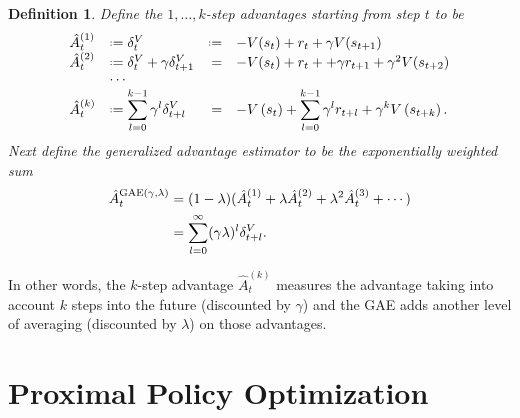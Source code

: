 \documentclass[12pt]{article}
\theoremstyle{plain}
\newtheorem{definition}[theorem]{Definition}
\theoremstyle{definition}
\theoremstyle{remark}
\newcommand{\0}{\varnothing}
\renewcommand{\d}{\delta}
\newcommand{\g}{\gamma}
\renewcommand{\l}{\lambda}
\newcommand*{\defeq}{\mathrel{\vcenter{\baselineskip0.5ex \lineskiplimit0pt
           \hbox{\scriptsize.}\hbox{\scriptsize.}}}
           =}
\newcommand{\<}{\langle}
\renewcommand{\>}{\rangle}
\begin{document}
\begin{definition}
Define the $ 1, \ldots, k $-step advantages starting from step $ t $ to be
\[
\begin{array}{llrl}
\hat{A}^{(1)}_{t} &\defeq \d^{V}_{t} &\defeq & -V(s_t) + r_t + \g V(s_{t+1}) \\
\hat{A}^{(2)}_{t} &\defeq \d^{V}_{t} + \g \d^{V}_{t+1} &= & -V(s_t) + r_t + + \g r_{t+1} + \g^2 V(s_{t+2}) \\
& \cdots \\
\hat{A}^{(k)}_{t} &\defeq \displaystyle\sum _ { l = 0 } ^ { k - 1 } \gamma ^ { l } \delta _ { t + l } ^ { V } &= & - V \left( s _ { t } \right) + \displaystyle\sum^{k-1}_{l=0 }\gamma ^ { l } r _ { t + l } + \gamma ^ { k } V \left( s _ { t + k } \right).
\end{array}
\]
Next define the generalized advantage estimator to be the exponentially weighted sum
\begin{align*}
\hat{A}^{\rm{GAE}(\g, \l)}_{t} &= (1 - \l) (\hat{A}^{(1)}_{t} + \l \hat{A}^{(2)}_{t} + \l^2 \hat{A}^{(3)}_{t} + \cdots) \\
&= \sum^{\infty}_{l=0} (\g\l)^l \d^V_{t+l}.
\end{align*}
\end{definition}

In other words, the $ k $-step advantage $ \hat{A}^{(k)}_{t} $ measures the advantage taking into account $ k $ steps into the future (discounted by $ \g $) and the GAE adds another level of averaging (discounted by $ \l $) on those advantages.

\section{Proximal Policy Optimization}
\end{document}
